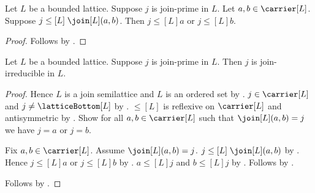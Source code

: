 \begin{proposition}\label{join_prime_elim}
    Let $L$ be a bounded lattice.
    Suppose $j$ is join-prime in $L$.
    Let $a,b\in\carrier[L]$.
    Suppose $j\mathrel{\leq[L]}\join[L](a,b)$.
    Then $j\mathrel{\leq[L]}a$ or $j\mathrel{\leq[L]}b$.
\end{proposition}
\begin{proof}
    Follows by .
\end{proof}

\begin{theorem}\label{join_prime_implies_join_irreducible}
    Let $L$ be a bounded lattice.
    Suppose $j$ is join-prime in $L$.
    Then $j$ is join-irreducible in $L$.
\end{theorem}
\begin{proof}
    Hence $L$ is a join semilattice and $L$ is an ordered set by
        .
    $j\in\carrier[L]$ and $j\neq\latticeBottom[L]$ by
        .
    $\leq[L]$ is reflexive on $\carrier[L]$ and antisymmetric by
        .
    Show for all $a,b\in\carrier[L]$ such that
        $\join[L](a,b)=j$ we have $j=a$ or $j=b$.
    \begin{subproof}
        Fix $a,b\in\carrier[L]$.
        Assume $\join[L](a,b)=j$.
        $j\mathrel{\leq[L]}\join[L](a,b)$ by
            .
        Hence $j\mathrel{\leq[L]}a$ or $j\mathrel{\leq[L]}b$ by
            .
        $a\mathrel{\leq[L]}j$ and $b\mathrel{\leq[L]}j$ by
            .
        Follows by .
    \end{subproof}
    Follows by .
\end{proof}

